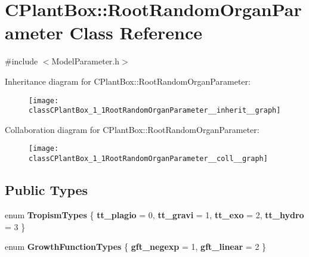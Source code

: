 \hypertarget{classCPlantBox_1_1RootRandomOrganParameter}{}\section{C\+Plant\+Box\+:\+:Root\+Random\+Organ\+Parameter Class Reference}
\label{classCPlantBox_1_1RootRandomOrganParameter}


{\ttfamily \#include $<$Model\+Parameter.\+h$>$}



Inheritance diagram for C\+Plant\+Box\+:\+:Root\+Random\+Organ\+Parameter\+:\nopagebreak
\begin{figure}[H]
\begin{center}
\leavevmode
\texttt{[image: classCPlantBox\_1\_1RootRandomOrganParameter\_\_inherit\_\_graph]}
\end{center}
\end{figure}


Collaboration diagram for C\+Plant\+Box\+:\+:Root\+Random\+Organ\+Parameter\+:\nopagebreak
\begin{figure}[H]
\begin{center}
\leavevmode
\texttt{[image: classCPlantBox\_1\_1RootRandomOrganParameter\_\_coll\_\_graph]}
\end{center}
\end{figure}
\subsection*{Public Types}
\begin{DoxyCompactItemize}
\item 
\mbox{\label{classCPlantBox_1_1RootRandomOrganParameter_abb89ba25fdbce871de27449e132c397c}} 
enum {\bfseries Tropism\+Types} \{ {\bfseries tt\+\_\+plagio} = 0, 
{\bfseries tt\+\_\+gravi} = 1, 
{\bfseries tt\+\_\+exo} = 2, 
{\bfseries tt\+\_\+hydro} = 3
 \}
\item 
\mbox{\label{classCPlantBox_1_1RootRandomOrganParameter_aee96663cad87fc9b2f538ce39d9db7db}} 
enum {\bfseries Growth\+Function\+Types} \{ {\bfseries gft\+\_\+negexp} = 1, 
{\bfseries gft\+\_\+linear} = 2
 \}
\end{DoxyCompactItemize}
